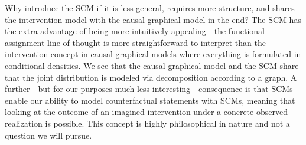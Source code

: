 \documentclass[11pt, a4paper]{memoir}
\theoremstyle{break}
\theoremstyle{break}
\theoremstyle{nonumberplain}
\begin{document}
Why introduce the SCM if it is less general, requires more structure, and shares the intervention model with the causal graphical model in the end? The SCM has the extra advantage of being more intuitively appealing - the functional assignment line of thought is more straightforward to interpret than the intervention concept in causal graphical models where everything is formulated in conditional densities. We see that the causal graphical model and the SCM share that the joint distribution is modeled via decomposition according to a graph. A further - but for our purposes much less interesting - consequence is that SCMs enable our ability to model counterfactual statements with SCMs, meaning that looking at the outcome of an imagined intervention under a concrete observed realization is possible. This concept is highly philosophical in nature and not a question we will pursue.
\end{document}

